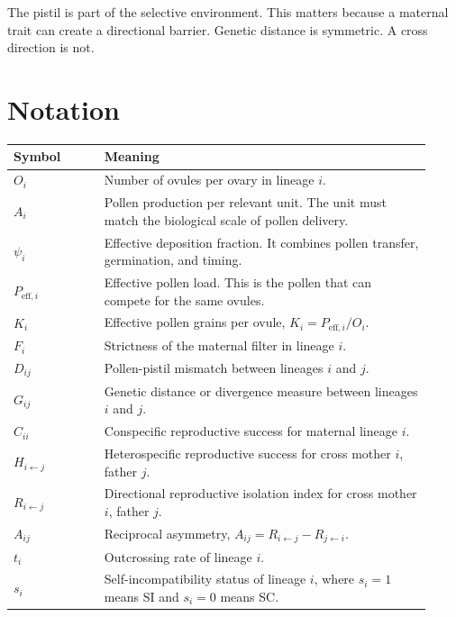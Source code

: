 \documentclass[12pt]{article}
\begin{document}
\begin{conclusionbox}
The pistil is part of the selective environment. This matters because a maternal trait can create a directional barrier. Genetic distance is symmetric. A cross direction is not.
\end{conclusionbox}

\section{Notation}

\begin{center}
\begin{tabular}{>{\raggedright\arraybackslash}p{0.20\linewidth} >{\raggedright\arraybackslash}p{0.72\linewidth}}
\toprule
Symbol & Meaning \\
\midrule
$O_i$ & Number of ovules per ovary in lineage $i$. \\
$A_i$ & Pollen production per relevant unit. The unit must match the biological scale of pollen delivery. \\
$\psi_i$ & Effective deposition fraction. It combines pollen transfer, germination, and timing. \\
$P_{\mathrm{eff},i}$ & Effective pollen load. This is the pollen that can compete for the same ovules. \\
$K_i$ & Effective pollen grains per ovule, $K_i=P_{\mathrm{eff},i}/O_i$. \\
$F_i$ & Strictness of the maternal filter in lineage $i$. \\
$D_{ij}$ & Pollen-pistil mismatch between lineages $i$ and $j$. \\
$G_{ij}$ & Genetic distance or divergence measure between lineages $i$ and $j$. \\
$C_{ii}$ & Conspecific reproductive success for maternal lineage $i$. \\
$H_{i\leftarrow j}$ & Heterospecific reproductive success for cross mother $i$, father $j$. \\
$R_{i\leftarrow j}$ & Directional reproductive isolation index for cross mother $i$, father $j$. \\
$A_{ij}$ & Reciprocal asymmetry, $A_{ij}=R_{i\leftarrow j}-R_{j\leftarrow i}$. \\
$t_i$ & Outcrossing rate of lineage $i$. \\
$s_i$ & Self-incompatibility status of lineage $i$, where $s_i=1$ means SI and $s_i=0$ means SC. \\
\bottomrule
\end{tabular}
\end{center}
\end{document}

